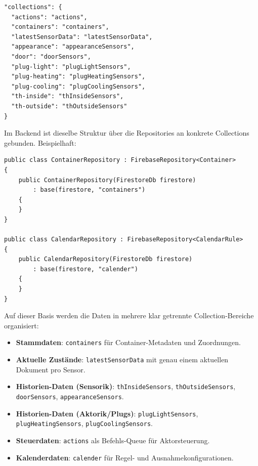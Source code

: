 \begin{lstlisting}[caption={Collection-Zuordnung in der Raspberry-Pi-Konfiguration},label={lst:db:collections:config},basicstyle=\ttfamily\small]
"collections": {
  "actions": "actions",
  "containers": "containers",
  "latestSensorData": "latestSensorData",
  "appearance": "appearanceSensors",
  "door": "doorSensors",
  "plug-light": "plugLightSensors",
  "plug-heating": "plugHeatingSensors",
  "plug-cooling": "plugCoolingSensors",
  "th-inside": "thInsideSensors",
  "th-outside": "thOutsideSensors"
}
\end{lstlisting}

Im Backend ist dieselbe Struktur über die Repositories an konkrete Collections gebunden. Beispielhaft:

\begin{lstlisting}[language={[Sharp]C},caption={Collection-Bindung in Firestore-Repositories},label={lst:db:collections:repositories},basicstyle=\ttfamily\small,breaklines=true,breakatwhitespace=false,columns=fullflexible]
public class ContainerRepository : FirebaseRepository<Container>
{
    public ContainerRepository(FirestoreDb firestore)
        : base(firestore, "containers")
    {
    }
}

public class CalendarRepository : FirebaseRepository<CalendarRule>
{
    public CalendarRepository(FirestoreDb firestore)
        : base(firestore, "calender")
    {
    }
}
\end{lstlisting}

Auf dieser Basis werden die Daten in mehrere klar getrennte Collection-Bereiche organisiert:

\begin{itemize}
    \item \textbf{Stammdaten}: \texttt{containers} für Container-Metadaten und Zuordnungen.
    \item \textbf{Aktuelle Zustände}: \texttt{latestSensorData} mit genau einem aktuellen Dokument pro Sensor.
    \item \textbf{Historien-Daten (Sensorik)}: \texttt{thInsideSensors}, \texttt{thOutsideSensors}, \texttt{doorSensors}, \texttt{appearanceSensors}.
    \item \textbf{Historien-Daten (Aktorik/Plugs)}: \texttt{plugLightSensors}, \texttt{plugHeatingSensors}, \texttt{plugCoolingSensors}.
    \item \textbf{Steuerdaten}: \texttt{actions} als Befehls-Queue für Aktorsteuerung.
    \item \textbf{Kalenderdaten}: \texttt{calender} für Regel- und Ausnahmekonfigurationen.
\end{itemize}

